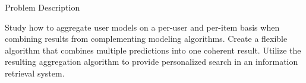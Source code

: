 \null\vspace{15em}
{
  \centering
  \normalfont
  \huge
  Problem Description\\
}
\vspace{2em}

\noindent
Study how to aggregate user models on a per-user and per-item
basis when combining results from complementing modeling algorithms.
Create a flexible algorithm that combines multiple predictions
into one coherent result.
Utilize the resulting aggregation algorithm
to provide personalized search in an information retrieval system.

\clearpage
